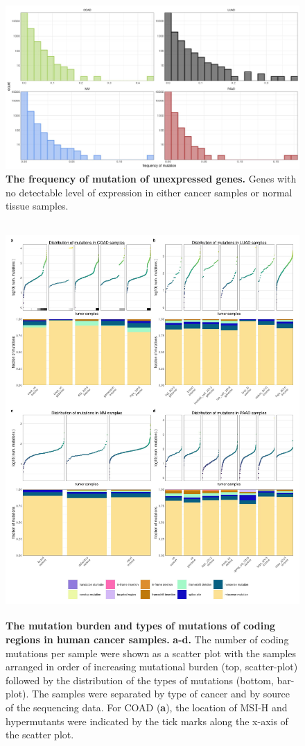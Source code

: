 \documentclass[english, 12pt, letterpaper]{article}
\begin{document}
\begin{figure}[p]
\centering
\includegraphics[width=\textwidth]{figures/SuppFigure_03.jpeg}
\caption{
    \textbf{The frequency of mutation of unexpressed genes.} Genes with no detectable level of expression in either cancer samples or normal tissue samples.
}
\label{sfig:mutfreq-of-unexpressed-genes}
\end{figure}


\begin{figure}[p]
\centering
\includegraphics[height=150mm]{figures/SuppFigure_04.jpeg}
\caption{
    \textbf{The mutation burden and types of mutations of coding regions in human cancer samples.}
    \textbf{a-d.} The number of coding mutations per sample were shown as a scatter plot with the samples arranged in order of increasing mutational burden (top, scatter-plot) followed by the distribution of the types of mutations (bottom, bar-plot). The samples were separated by type of cancer and by source of the sequencing data.
    For COAD (\textbf{a}), the location of MSI-H and hypermutants were indicated by the tick marks along the x-axis of the scatter plot.
}
\label{sfig:mutation-burden-of-cancer-samples}
\end{figure}
\end{document}
